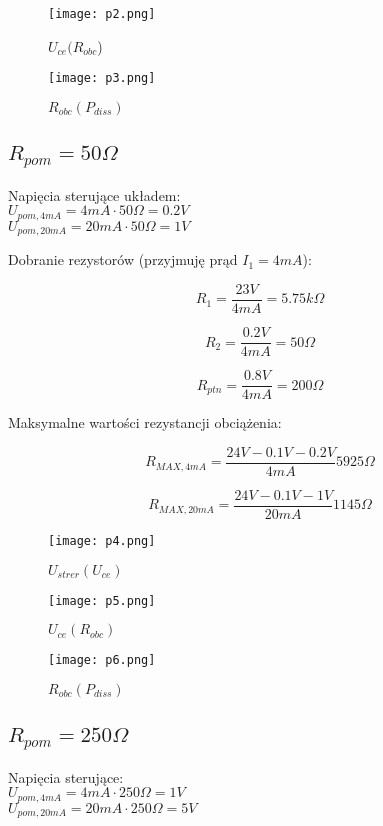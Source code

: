 \documentclass{article}
\begin{document}
\begin{figure}[h!]
    \centering
    \texttt{[image: p2.png]}
    \caption{$U_{ce}(R_{obc}$)}
\end{figure}


\begin{figure}[h!]
    \centering
    \texttt{[image: p3.png]}
    \caption{$R_{obc}(P_{diss})$}
\end{figure}

\subsection{$R_{pom}=50\Omega$}

Napięcia sterujące układem:\\
$U_{pom, 4mA}=4mA\cdot 50\Omega=0.2V$\\
$U_{pom, 20mA}=20mA\cdot 50\Omega=1V$


Dobranie rezystorów (przyjmuję prąd $I_{1}=4mA$):

$$
    R_{1}=\frac{23V}{4mA}=5.75k\Omega
$$

$$
    R_{2}=\frac{0.2V}{4mA}=50\Omega
$$

$$
    R_{ptn}=\frac{0.8V}{4mA}=200\Omega
$$



Maksymalne wartości rezystancji obciążenia:

$$
    R_{MAX, 4mA}=\frac{24V-0.1V-0.2V}{4mA}5925\Omega
$$

$$
    R_{MAX, 20mA}=\frac{24V-0.1V-1V}{20mA}1145\Omega
$$

\begin{figure}[h!]
    \texttt{[image: p4.png]}
    \centering
    \caption{$U_{strer}(U_{ce})$}
\end{figure}


\begin{figure}[h!]
    \texttt{[image: p5.png]}
    \centering
    \caption{$U_{ce}(R_{obc})$}
\end{figure}

\begin{figure}[h!]
    \texttt{[image: p6.png]}
    \centering
    \caption{$R_{obc}(P_{diss})$}
\end{figure}

\newpage
\subsection{$R_{pom}=250\Omega$}

Napięcia sterujące:\\
$U_{pom, 4mA}=4mA\cdot 250\Omega=1V$\\
$U_{pom, 20mA}=20mA\cdot 250\Omega=5V$
\end{document}
